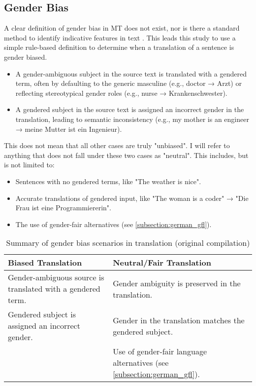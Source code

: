   
 \subsection{Gender Bias} \label{subsection:definition_gb}
    A clear definition of gender bias in MT does not exist, nor is there a standard method to identify indicative features in text \parencite{barclayInvestigatingMarkersDrivers2024a}. This leads this study to use a simple rule-based definition to determine when a translation of a sentence is gender biased.

        \begin{itemize}
        \item A gender-ambiguous subject in the source text is translated with a gendered term, often by defaulting to the generic masculine (e.g., doctor → Arzt) or reflecting stereotypical gender roles (e.g., nurse → Krankenschwester).
        \item A gendered subject in the source text is assigned an incorrect gender in the translation, leading to semantic inconsistency (e.g., my mother is an engineer → meine Mutter ist ein Ingenieur).
        \end{itemize}

    This does not mean that all other cases are truly "unbiased". I will refer to anything that does not fall under these two cases as "neutral". This includes, but is not limited to:

        \begin{itemize}
        \item Sentences with no gendered terms, like "The weather is nice".
        \item Accurate translations of gendered input, like "The woman is a coder" → "Die Frau ist eine Programmiererin".
        \item The use of gender-fair alternatives (see \autoref{subsection:german_gfl}).
        \end{itemize}

    \begin{table}[htb]
    \centering
    \begin{tabularx}{\linewidth}{X | X}
        \toprule
        \textbf{Biased Translation} & \textbf{Neutral/Fair Translation} \\
        \midrule
        Gender-ambiguous source is translated with a gendered term. & 
        Gender ambiguity is preserved in the translation. \\
        \addlinespace[0.5em]
        Gendered subject is assigned an incorrect gender. & 
        Gender in the translation matches the gendered subject. \\
        \addlinespace[0.5em]
        \multicolumn{1}{c|}{—} & 
        Use of gender-fair language alternatives (see \autoref{subsection:german_gfl}). \\
        \bottomrule
    \end{tabularx}
    \caption[Summary of gender bias scenarios in translation]{Summary of gender bias scenarios in translation (original compilation)}
    \label{tab:overview_bias_neutral}
    \end{table}

